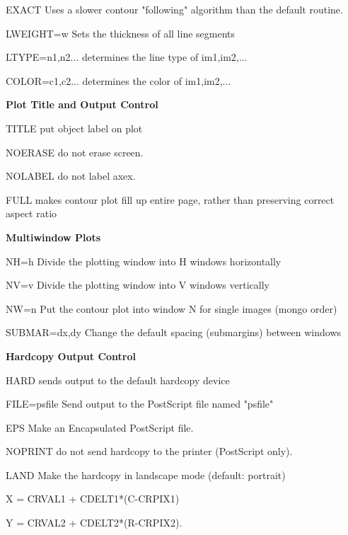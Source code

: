 {\begin{command}
  \item[EXACT]{Uses a slower contour "following" algorithm than the
       default routine.}
  \item[LWEIGHT=w]{Sets the thickness of all line segments}
  \item[LTYPE=n1,n2...]{determines the line type of im1,im2,...}
  \item[COLOR=c1,c2...]{determines the color of im1,im2,...}
  \item[\textbf{Plot Title and Output Control}\hfill]{}
  \item[TITLE]{put object label on plot}
  \item[NOERASE]{do not erase screen.}
  \item[NOLABEL ]{do not label axex.}
  \item[FULL ]{makes contour plot fill up entire page, rather
       than preserving correct aspect ratio}
  \item[\textbf{Multiwindow Plots}\hfill]{}
  \item[NH=h]{Divide the plotting window into H windows horizontally}
  \item[NV=v]{Divide the plotting window into V windows vertically}
  \item[NW=n]{Put the contour plot into window N for single images 
       (mongo order)}
  \item[SUBMAR=dx,dy]{Change the default spacing (submargins) between windows}
  \item[\textbf{Hardcopy Output Control}\hfill]{}
  \item[HARD]{sends output to the default hardcopy device}
  \item[FILE=psfile]{Send output to the PostScript file named "psfile"}
  \item[EPS]{Make an Encapsulated PostScript file.}
  \item[NOPRINT]{do not send hardcopy to the printer (PostScript only).}
  \item[LAND]{Make the hardcopy in landscape mode (default: portrait)}
\end{command}%
\lthtmlfigureZ
\lthtmlcheckvsize\clearpage}

{\newpage\clearpage
{}%
\begin{hanging} 
  \item{X = CRVAL1 + CDELT1*(C-CRPIX1)}
  \item{Y = CRVAL2 + CDELT2*(R-CRPIX2).}
\end{hanging}%
\lthtmlfigureZ
\lthtmlcheckvsize\clearpage}


